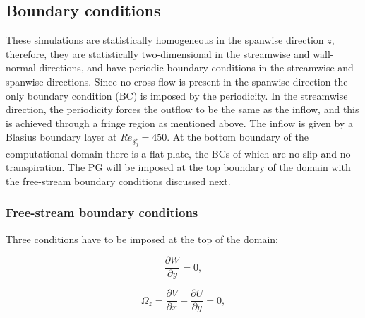 \subsection{Boundary conditions} \label{subsec:BC}

These simulations are statistically homogeneous in the spanwise direction $z$, therefore, they are statistically two-dimensional in the streamwise and wall-normal directions, and have periodic boundary conditions in the streamwise and spanwise directions. 
Since no cross-flow is present in the spanwise direction the only boundary condition (BC) is imposed by the periodicity. In the streamwise direction, the periodicity forces the outflow to be the same as the inflow, and this is achieved through a fringe region as mentioned above. 
The inflow is given by a Blasius boundary layer at $Re_{\delta^*_0}=450$.
At the bottom boundary of the computational domain there is a flat plate, the BCs of which are no-slip and no transpiration. 
The PG will be imposed at the top boundary of the domain with the free-stream boundary conditions discussed next.

\subsubsection{Free-stream boundary conditions}
Three conditions have to be imposed at the top of the domain:

\begin{equation} 
    \frac{\partial W}{\partial y}=0,
\label{eq:BC_dWdy}
\end{equation}

\begin{equation} 
    \Omega_z = \frac{\partial V}{\partial x} - \frac{\partial U}{\partial y}=0,
\label{eq:BC_Vort_z}
\end{equation}

